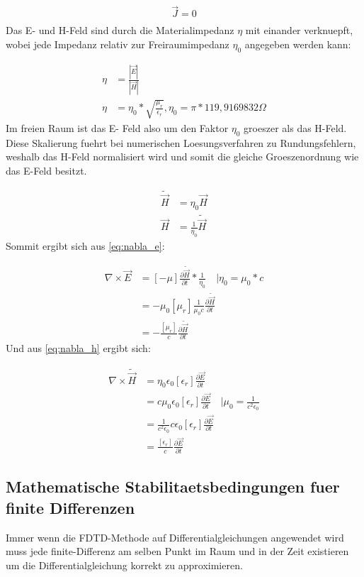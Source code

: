 \documentclass[11pt, ngerman]{article}
\begin{document}
\begin{align}
	\vec{J} = 0\nonumber\\
\end{align}
Das E- und H-Feld sind durch die Materialimpedanz \(\eta\) mit einander verknuepft, wobei jede
Impedanz relativ zur Freiraumimpedanz \(\eta_0\) angegeben werden kann:

\begin{align}
	\eta &= \frac{|\vec{E}|}{|\vec{H}|} \nonumber\\
	\eta &= \eta_0 * \sqrt{\frac{\mu_r}{\epsilon_r}}, \eta_0 = \pi*119,9169832\Omega
\end{align}
Im freien Raum ist das E- Feld also um den Faktor \(\eta_0\) groeszer als das H-Feld.
Diese Skalierung fuehrt bei numerischen Loesungsverfahren zu Rundungsfehlern,
weshalb das H-Feld normalisiert wird und somit die gleiche Groeszenordnung wie das
E-Feld besitzt.\cite{normalize_h_field}

\begin{align}
	\widetilde{\vec{H}} &= \eta_0\vec{H}\nonumber\\
	\vec{H} &= \frac{1}{\eta_0}\widetilde{\vec{H}}
\end{align}
Sommit ergibt sich aus \cref{eq:nabla_e}:

\begin{align}
	\nabla\times\vec{E} &= [-\mu]\frac{\partial\widetilde{\vec{H}}}{\partial t} * \frac{1}{\eta_0}\quad\vert \eta_0 = \mu_0 * c\\
	&=-\mu_0[\mu_r]\frac{1}{\mu_0c}\frac{\partial\widetilde{\vec{H}}}{\partial t}\\
	&=-\frac{[\mu_r]}{c}\frac{\partial\widetilde{\vec{H}}}{\partial t}
\end{align}
Und aus \cref{eq:nabla_h} ergibt sich:

\begin{align}
	\nabla\times\widetilde{\vec{H}} &= \eta_0\epsilon_0[\epsilon_r]\frac{\partial\vec{E}}{\partial t}\\
	&= c\mu_0\epsilon_0[\epsilon_r]\frac{\partial\vec{E}}{\partial t}\quad\vert \mu_0 = \frac{1}{c^2\epsilon_0}\\
	&= \frac{1}{c^2\epsilon_0}c\epsilon_0[\epsilon_r]\frac{\partial\vec{E}}{\partial t}\\
	&= \frac{[\epsilon_r]}{c}\frac{\partial\vec{E}}{\partial t}
\end{align}


\subsection{Mathematische Stabilitaetsbedingungen fuer finite Differenzen}
Immer wenn die FDTD-Methode auf Differentialgleichungen angewendet
wird muss jede finite-Differenz am selben Punkt im Raum und in der
Zeit existieren um die Differentialgleichung korrekt zu approximieren.\cite{fdtd_stabilitaet}
\end{document}
